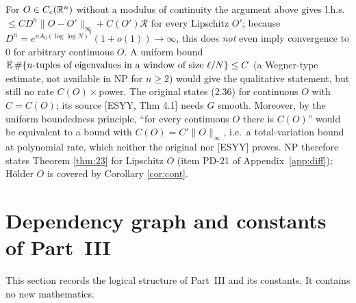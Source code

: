 \begin{remark}\label{rem:contO}
For $O\in C_c(\mathbb{R}^n)$ without a modulus of continuity the argument above gives l.h.s.\ $\le C D^n\|O-O'\|_\infty+C(O')\mathcal R$ for every Lipschitz $O'$; because $D^n=e^{nA_0(\log\log N)^2}(1+o(1))\to\infty$, this does \emph{not} even imply convergence to $0$ for arbitrary continuous $O$.
A uniform bound $\mathbb{E}\,\#\{n\text{-tuples of eigenvalues in a window of size }\ell/N\}\le C$ (a Wegner-type estimate, not available in NP for $n\ge2$) would give the qualitative statement, but still no rate $C(O)\times$power.
The original states (2.36) for continuous $O$ with $C=C(O)$; its source [ESYY, Thm 4.1] needs $G$ smooth. Moreover, by the uniform boundedness principle, ``for every continuous $O$ there is $C(O)$'' would be equivalent to a bound with $C(O)=C'\|O\|_\infty$, i.e.\ a total-variation bound at polynomial rate, which neither the original nor [ESYY] proves.
NP therefore states Theorem \ref{thm:23} for Lipschitz $O$ (item PD-21 of Appendix~\ref{app:diff}); H\"older $O$ is covered by Corollary \ref{cor:cont}.
\end{remark}
\section{Dependency graph and constants of Part~III}\label{sec:C9}

This section records the logical structure of Part~III and its constants. It contains no new mathematics.

